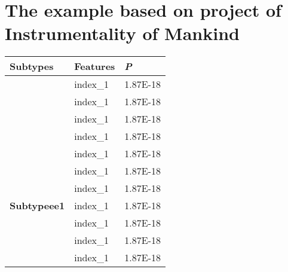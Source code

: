 

\chapternumberfont{\fontsize{16pt}{16pt}\selectfont}
\chaptertitlefont{\fontsize{16pt}{16pt}\selectfont}

\chapter{The example based on project of Instrumentality of Mankind}

\setlength\LTleft{0pt}
\setlength\LTright{0pt}
\begin{longtable}{@{\extracolsep{\fill}}lll@{}}
    \toprule  %
    \multicolumn{1}{l}{\textbf{Subtypes}} & \textbf{Features}                   & \textit{\textbf{P}} \\ \hline
    \endhead %
                                          & index\_1                            & 1.87E-18            \\
                                          & index\_1                            & 1.87E-18            \\
                                          & index\_1                            & 1.87E-18            \\
                                          & index\_1                            & 1.87E-18            \\
                                          & index\_1                            & 1.87E-18            \\
                                          & index\_1                            & 1.87E-18            \\
                                          & index\_1                            & 1.87E-18            \\
\textbf{Subtypeee1}                       & index\_1                            & 1.87E-18            \\
                                          & index\_1                            & 1.87E-18            \\
                                          & index\_1                            & 1.87E-18            \\
                                          & index\_1                            & 1.87E-18            \\

\end{longtable}
